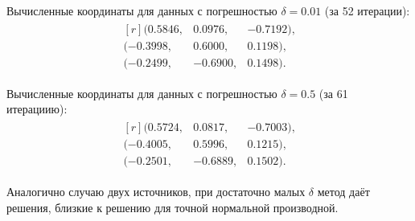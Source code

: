 Вычисленные координаты для данных с погрешностью $\delta=0.01$ (за 52 итерации):
\begin{align*}
    \begin{matrix*}[r]
    (0.5846, & 0.0976, & -0.7192) \text{,}\\
    (-0.3998, & 0.6000, & 0.1198) \text{,}\\
    (-0.2499, & -0.6900, & 0.1498) \text{.}
    \end{matrix*}
\end{align*}

Вычисленные координаты для данных с погрешностью $\delta=0.5$ (за 61 итерациию):
\begin{align*}
    \begin{matrix*}[r]
    (0.5724, & 0.0817, & -0.7003) \text{,}\\
    (-0.4005, & 0.5996, & 0.1215) \text{,}\\
    (-0.2501, & -0.6889, & 0.1502) \text{.}
    \end{matrix*}
\end{align*}

Аналогично случаю двух источников, при достаточно малых $\delta$ метод даёт решения, близкие к решению для точной нормальной производной.